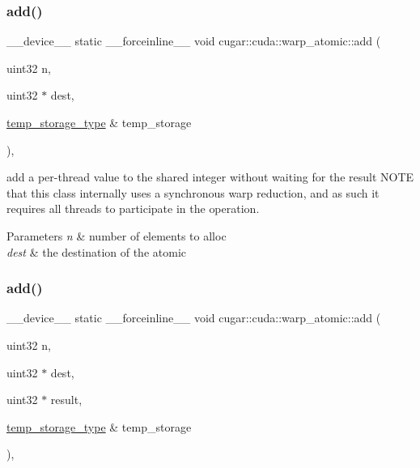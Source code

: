\subsubsection{\texorpdfstring{add()}{add()}\hspace{0.1cm}{\footnotesize\ttfamily [5/6]}}
{\footnotesize\ttfamily \+\_\+\+\_\+device\+\_\+\+\_\+ static \+\_\+\+\_\+forceinline\+\_\+\+\_\+ void cugar\+::cuda\+::warp\+\_\+atomic\+::add (\begin{DoxyParamCaption}\item[{uint32}]{n,  }\item[{uint32 $\ast$}]{dest,  }\item[{\hyperlink{structcugar_1_1cuda_1_1warp__atomic_1_1temp__storage__type}{temp\+\_\+storage\+\_\+type} \&}]{temp\+\_\+storage }\end{DoxyParamCaption})\hspace{0.3cm}{\ttfamily [inline]}, {\ttfamily [static]}}

add a per-\/thread value to the shared integer without waiting for the result N\+O\+TE that this class internally uses a synchronous warp reduction, and as such it requires all threads to participate in the operation.


\begin{DoxyParams}{Parameters}
{\em n} & number of elements to alloc \\
\hline
{\em dest} & the destination of the atomic \\
\hline
\end{DoxyParams}
\mbox{\label{structcugar_1_1cuda_1_1warp__atomic_a10f2954d921d4cad97af46747cc5b8d9}} 
\subsubsection{\texorpdfstring{add()}{add()}\hspace{0.1cm}{\footnotesize\ttfamily [6/6]}}
{\footnotesize\ttfamily \+\_\+\+\_\+device\+\_\+\+\_\+ static \+\_\+\+\_\+forceinline\+\_\+\+\_\+ void cugar\+::cuda\+::warp\+\_\+atomic\+::add (\begin{DoxyParamCaption}\item[{uint32}]{n,  }\item[{uint32 $\ast$}]{dest,  }\item[{uint32 $\ast$}]{result,  }\item[{\hyperlink{structcugar_1_1cuda_1_1warp__atomic_1_1temp__storage__type}{temp\+\_\+storage\+\_\+type} \&}]{temp\+\_\+storage }\end{DoxyParamCaption})\hspace{0.3cm}{\ttfamily [inline]}, {\ttfamily [static]}}

